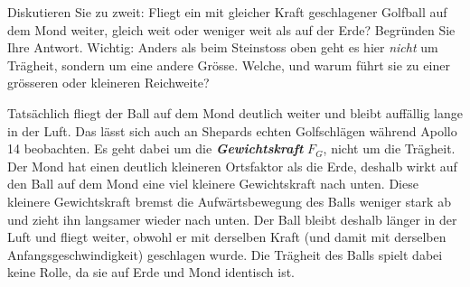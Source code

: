 \documentclass[addpoints,11pt,a4paper]{exam}
\newlength{\antwortraumlen}
\newcommand{\Antwortraum}[1]{%
  \pgfmathsetlength{\antwortraumlen}{#1*2.5cm}%
  \begin{answerbox}
    \rule{0pt}{\antwortraumlen}%
  \end{answerbox}%
}
\begin{document}
\begin{questions}
\begin{groupbox}
Diskutieren Sie zu zweit: Fliegt ein mit gleicher Kraft geschlagener
Golfball auf dem Mond weiter, gleich weit oder weniger weit als auf der
Erde? Begründen Sie Ihre Antwort. Wichtig: Anders als beim Steinstoss oben
geht es hier \emph{nicht} um Trägheit, sondern um eine andere Grösse.
Welche, und warum führt sie zu einer grösseren oder kleineren Reichweite?
\Antwortraum{5}
\begin{solution}
Tatsächlich fliegt der Ball auf dem Mond deutlich weiter und bleibt
auffällig lange in der Luft. Das lässt sich auch an Shepards echten
Golfschlägen während Apollo 14 beobachten. Es geht dabei um die
\textbf{\emph{Gewichtskraft}} $F_G$, nicht um die Trägheit. Der Mond hat
einen deutlich kleineren Ortsfaktor als die Erde, deshalb wirkt auf den
Ball auf dem Mond eine viel kleinere Gewichtskraft nach unten. Diese
kleinere Gewichtskraft bremst die Aufwärtsbewegung des Balls weniger stark
ab und zieht ihn langsamer wieder nach unten. Der Ball bleibt deshalb
länger in der Luft und fliegt weiter, obwohl er mit derselben Kraft (und
damit mit derselben Anfangsgeschwindigkeit) geschlagen wurde. Die Trägheit
des Balls spielt dabei keine Rolle, da sie auf Erde und Mond identisch ist.
\end{solution}
\end{groupbox}
\end{questions}
\end{document}
